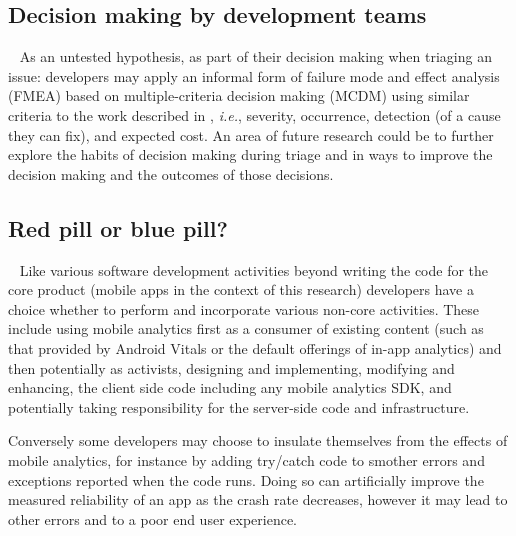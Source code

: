 \subsection{Decision making by development teams}~\label{discussion-decision-making-by-dev-teams-section}
As an untested hypothesis, as part of their decision making when triaging an issue: developers may apply an informal form of failure mode and effect analysis (FMEA) based on multiple-criteria decision making (MCDM) using similar criteria to the work described in , \emph{i.e.}, severity, occurrence, detection (of a cause they can fix), and expected cost. An area of future research could be to further explore the habits of decision making during triage and in ways to improve the decision making and the outcomes of those decisions.


\subsection{Red pill or blue pill?}~\label{discussion-red-pill-or-blue-pill}
Like various software development activities beyond writing the code for the core product (mobile apps in the context of this research) developers have a choice whether to perform and incorporate various non-core activities. These include using mobile analytics first as a consumer of existing content (such as that provided by Android Vitals or the default offerings of in-app analytics) and then potentially as activists, designing and implementing, modifying and enhancing, the client side code including any mobile analytics SDK, and potentially taking responsibility for the server-side code and infrastructure. 

Conversely some developers may choose to insulate themselves from the effects of mobile analytics, for instance by adding try/catch code to smother errors and exceptions reported when the code runs. Doing so can artificially improve the measured reliability of an app as the crash rate decreases, however it may lead to other errors and to a poor end user experience.

